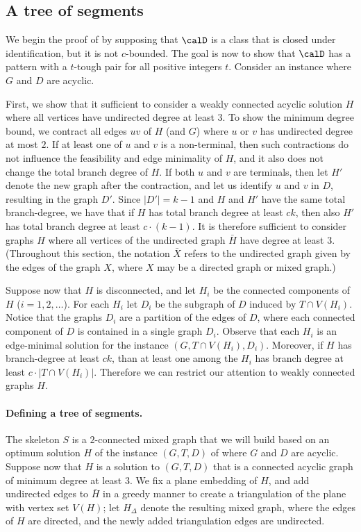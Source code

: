 \subsection{A tree of segments}\label{sec:skeleton}

We begin the proof of  by supposing that $\calD$ is a class that is closed under identification, but it is not $c$-bounded. The goal is now to show that $\calD$ has a pattern with a $t$-tough pair for all positive integers $t$. Consider an instance where $G$ and $D$ are acyclic.

First, we show that it sufficient to consider a weakly connected acyclic solution $H$ where all vertices have undirected degree at least $3$. To show the minimum degree bound, we contract all edges $uv$ of $H$ (and $G$) where $u$ or $v$ has undirected degree at most $2$. If at least one of $u$ and $v$ is a non-terminal, then such contractions do not influence the feasibility and edge minimality of $H$, and it also does not change the total branch degree of $H$. If both $u$ and $v$ are terminals, then let $H'$ denote the new graph after the contraction, and let us identify $u$ and $v$ in $D$, resulting in the graph $D'$. Since $|D'|=k-1$ and $H$ and $H'$ have the same total branch-degree, we have that if $H$ has total branch degree at least $ck$, then also $H'$ has total branch degree at least $c\cdot (k-1)$. It is therefore sufficient to consider graphs $H$ where all vertices of the undirected graph $\bar H$ have degree at least $3$. (Throughout this section, the notation $\bar{X}$ refers to the undirected graph given by the edges of the graph $X$, where $X$ may be a directed graph or mixed graph.) 

Suppose now that $H$ is disconnected, and let $H_i$ be the connected components of $H$ ($i=1,2,\dots$). For each $H_i$ let $D_i$ be the subgraph of $D$ induced by $T\cap V(H_i)$. Notice that the graphs $D_i$ are a partition of the edges of $D$, where each connected component of $D$ is contained in a single graph $D_i$. Observe that each $H_i$ is an edge-minimal solution for the instance $(G,T\cap V(H_i), D_i)$. Moreover, if $H$ has branch-degree at least $ck$, than at least one among the $H_i$ has branch degree at least $c\cdot|T\cap V(H_i)|$. Therefore we can restrict our attention to weakly connected graphs $H$.


\paragraph*{Defining a tree of segments.}
The skeleton $S$ is a $2$-connected mixed graph that we will build based on an optimum solution $H$ of the instance $(G,T,D)$ of \Dsn where $G$ and $D$ are acyclic.
Suppose now that $H$ is a solution to $(G,T,D)$ that is a connected acyclic graph of minimum degree at least $3$.
We fix a plane embedding of $H$, and add undirected edges to $\bar{H}$ in a greedy manner to create a triangulation of the plane with vertex set $V(H)$; let $H_\Delta$ denote the resulting mixed graph, where the edges of $H$ are directed, and the newly added triangulation edges are undirected.


